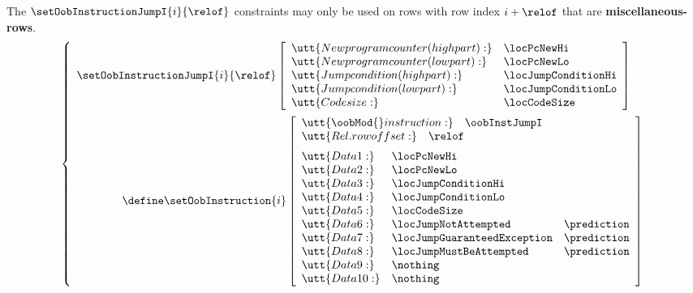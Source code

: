 \saNote{} The $\setOobInstructionJumpI {i}{\relof}$ constraints may only be used on rows with row index $i + \relof$ that are \textbf{miscellaneous-rows}.
\[
        \left\{ \begin{array}{l}
                \setOobInstructionJumpI {i}{\relof}
                \left[ \begin{array}{llr}
                        \utt{New program counter (high part):} & \locPcNewHi         \\
                        \utt{New program counter (low  part):} & \locPcNewLo         \\
                        \utt{Jump condition (high part):}      & \locJumpConditionHi \\
                        \utt{Jump condition (low  part):}      & \locJumpConditionLo \\
                        \utt{Code size:}                       & \locCodeSize        \\
                \end{array} \right] \vspace{2mm} \\
                \qquad \qquad \define
                \setOobInstruction{i}
                \left[ \begin{array}{llr}
                        \multicolumn{3}{l}{\utt{\oobMod{} instruction:} \quad \oobInstJumpI} \\
                        \multicolumn{3}{l}{\utt{Rel. row offset:}            \quad \relof}         \vspace{2mm} \\
			\utt{Data 1:}  & \locPcNewHi                 \\
                        \utt{Data 2:}  & \locPcNewLo                 \\
                        \utt{Data 3:}  & \locJumpConditionHi         \\
                        \utt{Data 4:}  & \locJumpConditionLo         \\
                        \utt{Data 5:}  & \locCodeSize                \\
                        \utt{Data 6:}  & \locJumpNotAttempted         & \prediction \\
                        \utt{Data 7:}  & \locJumpGuaranteedException  & \prediction \\
                        \utt{Data 8:}  & \locJumpMustBeAttempted      & \prediction \\
                        \utt{Data 9:}  & \nothing                    \\
                        \utt{Data 10:} & \nothing                    \\
                \end{array} \right] \\
        \end{array} \right.
\]
